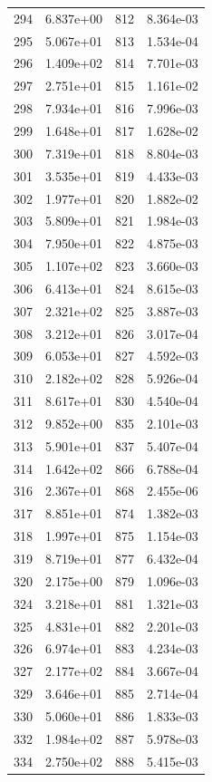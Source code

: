 \documentclass[12pt]{article}
\begin{document}
\begin{longtable}{@{}cccc@{}}
294 & 6.837e+00 & 812 & 8.364e-03 \\
295 & 5.067e+01 & 813 & 1.534e-04 \\
296 & 1.409e+02 & 814 & 7.701e-03 \\
297 & 2.751e+01 & 815 & 1.161e-02 \\
298 & 7.934e+01 & 816 & 7.996e-03 \\
299 & 1.648e+01 & 817 & 1.628e-02 \\
300 & 7.319e+01 & 818 & 8.804e-03 \\
301 & 3.535e+01 & 819 & 4.433e-03 \\
302 & 1.977e+01 & 820 & 1.882e-02 \\
303 & 5.809e+01 & 821 & 1.984e-03 \\
304 & 7.950e+01 & 822 & 4.875e-03 \\
305 & 1.107e+02 & 823 & 3.660e-03 \\
306 & 6.413e+01 & 824 & 8.615e-03 \\
307 & 2.321e+02 & 825 & 3.887e-03 \\
308 & 3.212e+01 & 826 & 3.017e-04 \\
309 & 6.053e+01 & 827 & 4.592e-03 \\
310 & 2.182e+02 & 828 & 5.926e-04 \\
311 & 8.617e+01 & 830 & 4.540e-04 \\
312 & 9.852e+00 & 835 & 2.101e-03 \\
313 & 5.901e+01 & 837 & 5.407e-04 \\
314 & 1.642e+02 & 866 & 6.788e-04 \\
316 & 2.367e+01 & 868 & 2.455e-06 \\
317 & 8.851e+01 & 874 & 1.382e-03 \\
318 & 1.997e+01 & 875 & 1.154e-03 \\
319 & 8.719e+01 & 877 & 6.432e-04 \\
320 & 2.175e+00 & 879 & 1.096e-03 \\
324 & 3.218e+01 & 881 & 1.321e-03 \\
325 & 4.831e+01 & 882 & 2.201e-03 \\
326 & 6.974e+01 & 883 & 4.234e-03 \\
327 & 2.177e+02 & 884 & 3.667e-04 \\
329 & 3.646e+01 & 885 & 2.714e-04 \\
330 & 5.060e+01 & 886 & 1.833e-03 \\
332 & 1.984e+02 & 887 & 5.978e-03 \\
334 & 2.750e+02 & 888 & 5.415e-03 \\

\end{longtable}
\end{document}
